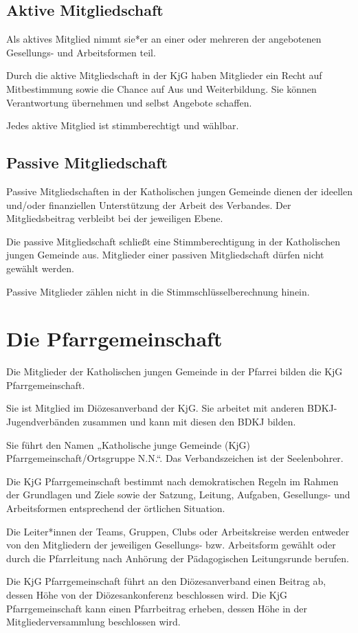 \documentclass[12pt]{report}
\begin{document}
\begin{justify}
\subsection{Aktive Mitgliedschaft}
Als aktives Mitglied nimmt sie*er an einer oder mehreren der angebotenen Gesellungs- und Arbeitsformen teil.

Durch die aktive Mitgliedschaft in der KjG haben Mitglieder ein Recht auf Mitbestimmung
sowie die Chance auf Aus­ und Weiterbildung. Sie können Verantwortung übernehmen und selbst
Angebote schaffen.

Jedes aktive Mitglied ist stimmberechtigt und wählbar.
\subsection{Passive Mitgliedschaft}
Passive Mitgliedschaften in der Katholischen jungen Gemeinde dienen der ideellen und/oder finanziellen Unterstützung der Arbeit des Verbandes.
Der Mitgliedsbeitrag verbleibt bei der jeweiligen Ebene.

Die passive Mitgliedschaft schließt eine Stimmberechtigung in der Katholischen jungen
Gemeinde aus. Mitglieder einer passiven Mitgliedschaft dürfen nicht gewählt werden.

Passive Mitglieder zählen nicht in die Stimmschlüsselberechnung hinein.
\section{Die Pfarrgemeinschaft}
Die Mitglieder der Katholischen jungen Gemeinde in der Pfarrei bilden die KjG Pfarrgemeinschaft.

Sie ist Mitglied im Diözesanverband der KjG. Sie arbeitet mit anderen
BDKJ-Jugendverbänden zusammen und kann mit diesen den BDKJ bilden.

Sie führt den Namen „Katholische junge Gemeinde (KjG) Pfarrgemeinschaft/Ortsgruppe N.N.“.
Das Verbandszeichen ist der Seelenbohrer.

Die KjG Pfarrgemeinschaft bestimmt nach demokratischen Regeln im Rahmen der Grundlagen
und Ziele sowie der Satzung, Leitung, Aufgaben, Gesellungs- und Arbeitsformen entsprechend
der örtlichen Situation.

Die Leiter*innen der Teams, Gruppen, Clubs oder Arbeitskreise werden entweder von den Mitgliedern
der jeweiligen Gesellungs- bzw. Arbeitsform gewählt oder durch die Pfarrleitung nach
Anhörung der Pädagogischen Leitungsrunde berufen.

Die KjG Pfarrgemeinschaft führt an den Diözesanverband einen Beitrag ab, dessen Höhe von der
Diözesankonferenz beschlossen wird. Die KjG Pfarrgemeinschaft kann einen Pfarrbeitrag erheben,
dessen Höhe in der Mitgliederversammlung beschlossen wird.


\end{justify}
\end{document}
